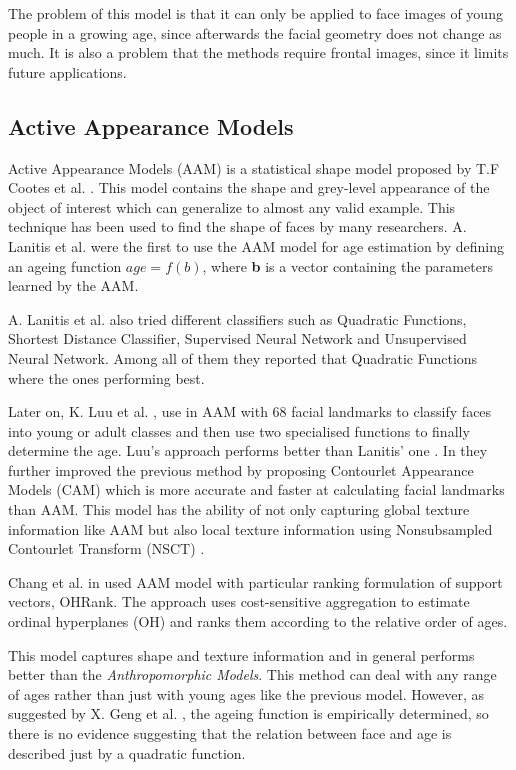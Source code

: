 The problem of this model is that it can only be applied to face images of young people in a growing age, since afterwards the facial geometry does not change as much. It is also a problem that the methods require frontal images, since it limits future applications.

\subsection{Active Appearance Models}

Active Appearance Models (AAM) is a statistical shape model proposed by T.F Cootes et al. \cite{Cootes:2001:AAM:378040.378090}. This model contains the shape and grey-level appearance of the object of interest which can generalize to almost any valid example. This technique has been used to find the shape of faces by many researchers. A. Lanitis et al. \cite{791208} \cite{993553} \cite{Lanitis:2004:CDC:2225304.2226166} were the first to use the AAM model for age estimation by defining an ageing function $age=f(b)$, where \textbf{b} is a vector containing the parameters learned by the AAM.

A. Lanitis et al. \cite{Lanitis:2004:CDC:2225304.2226166} also tried different classifiers such as Quadratic Functions, Shortest Distance Classifier, Supervised Neural Network and Unsupervised Neural Network. Among all of them they reported that Quadratic Functions where the ones performing best.

Later on, K. Luu et al. \cite{Luu:2009:AEU:1736406.1736456, LuuSSBS11}, use in \cite{Luu:2009:AEU:1736406.1736456} AAM with 68 facial landmarks to classify faces into young or adult classes and then use two specialised functions to finally determine the age. Luu's approach performs better than Lanitis' one \cite{Lanitis:2004:CDC:2225304.2226166}. In \cite{LuuSSBS11} they further improved the previous method by proposing Contourlet Appearance Models (CAM) which is more accurate and faster at calculating facial landmarks than AAM. This model has the ability of not only capturing global texture information like AAM but also local texture information using Nonsubsampled Contourlet Transform (NSCT) \cite{1703596}.

Chang et al. in \cite{5995437} used AAM model with particular ranking formulation of support vectors, OHRank. The approach uses cost-sensitive aggregation to estimate ordinal hyperplanes (OH) and ranks them according to the relative order of ages.

This model captures shape and texture information and in general performs better than the \textit{Anthropomorphic Models}. This method can deal with any range of ages rather than just with young ages like the previous model. However, as suggested by X. Geng et al. \cite{Geng:2006:LFA:1180639.1180711}, the ageing function is empirically determined, so there is no evidence suggesting that the relation between face and age is described just by a quadratic function.

